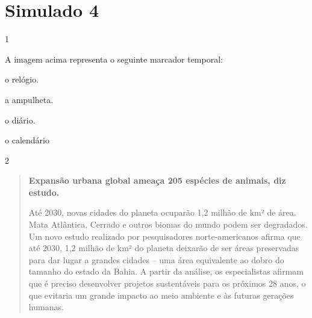 \chapter{Simulado 4}

\num{1}


A imagem acima representa o seguinte marcador temporal:

\begin{escolha}
\item o relógio.

\item a ampulheta.

\item o diário.

\item o calendário
\end{escolha}


\num{2}

\begin{quote}
\textbf{Expansão urbana global ameaça 205 espécies de animais, diz estudo.}

Até 2030, novas cidades do planeta ocuparão 1,2 milhão de km² de área.
Mata Atlântica, Cerrado e outros biomas do mundo podem ser degradados.
Um novo estudo realizado por pesquisadores norte-americanos afirma que
até 2030, 1,2 milhão de km² do planeta deixarão de ser áreas preservadas
para dar lugar a grandes cidades -- uma área equivalente ao dobro do
tamanho do estado da Bahia. A partir da análise, os especialistas
afirmam que é preciso desenvolver projetos sustentáveis para os próximos
28 anos, o que evitaria um grande impacto ao meio ambiente e às futuras
gerações humanas.
\end{quote}

